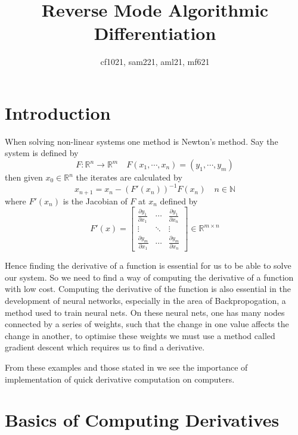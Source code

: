 \documentclass{article}
\title{Reverse Mode Algorithmic Differentiation}
\author{cf1021, sam221, aml21, mf621}
\date{}
\begin{document}
\maketitle

\tableofcontents
\newpage

\section{Introduction}

When solving non-linear systems one method is Newton's method. Say the system is defined by
\begin{equation} \label{Fxy}
        F: \mathbb{R}^n \rightarrow \mathbb{R}^m \quad F(x_1, \cdots, x_n) = (y_1, \cdots, y_m)
\end{equation}
then given $x_0 \in \mathbb{R}^n$ the iterates are calculated by
\begin{equation*}
x_{n+1} = x_n - (F'(x_n))^{-1}F(x_n) \quad n \in \mathbb{N}
\end{equation*}
where $F'(x_n)$ is the Jacobian of $F$ at $x_n$ defined by
\begin{equation} \label{jacobian}
    F'(x) = \begin{bmatrix}
        \frac{\partial y_1}{\partial x_1} & \cdots & \frac{\partial y_1}{\partial x_n} \\
        \vdots & \ddots & \vdots \\
        \frac{\partial y_m}{\partial x_1} & \cdots & \frac{\partial y_m}{\partial x_n}
    \end{bmatrix} \in \mathbb{R}^{m \times n}
\end{equation}

Hence finding the derivative of a function is essential for us to be able to solve our system. So we need to find a way of computing the derivative of a function with low cost. Computing the derivative of the function is also essential in the development of neural networks, especially in the area of Backpropogation, a method used to train neural nets. On these neural nets, one has many nodes connected by a series of weights, such that the change in one value affects the change in another, to optimise these weights we must use a method called gradient descent which requires us to find a derivative.

From these examples and those stated in \cite{appad} we see the importance of implementation of quick derivative computation on computers.

\section{Basics of Computing Derivatives}
\end{document}
